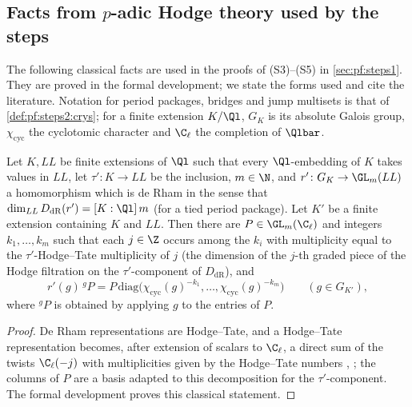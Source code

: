 \subsection{Facts from $p$-adic Hodge theory used by the steps}\label{sec:pf:geo:padic}

The following classical facts are used in the proofs of (S3)--(S5) in \cref{sec:pf:steps1}. They are
proved in the formal development; we state the forms used and cite the literature. Notation for
period packages, bridges and jump multisets is that of \cref{def:pf:steps2:crys}; for a finite
extension $K/\Ql$, $G_K$ is its absolute Galois group, $\chi_{\mathrm{cyc}}$ the cyclotomic character and
$\C_\ell$ the completion of $\Qlbar$.

\begin{proposition}\label{pf:geo:htbasis}
Let $K,LL$ be finite extensions of $\Ql$ such that every $\Ql$-embedding of $K$ takes values in $LL$, let
$\tau'\colon K\to LL$ be the inclusion, $m\in\N$, and $r'\colon G_K\to\GL_m(LL)$ a homomorphism which is de Rham
in the sense that $\dim_{LL}D_{\mathrm{dR}}(r')=[K:\Ql]\,m$ (for a tied period package). Let $K'$ be a finite
extension containing $K$ and $LL$. Then there are $P\in\GL_m(\C_\ell)$ and integers $k_1,\dots,k_m$ such that
each $j\in\Z$ occurs among the $k_i$ with multiplicity equal to the $\tau'$-Hodge--Tate multiplicity of $j$ (the
dimension of the $j$-th graded piece of the Hodge filtration on the $\tau'$-component of $D_{\mathrm{dR}}$),
and
\[
  r'(g)\,{}^gP=P\,\mathrm{diag}\bigl(\chi_{\mathrm{cyc}}(g)^{-k_1},\dots,\chi_{\mathrm{cyc}}(g)^{-k_m}\bigr)\qquad(g\in G_{K'}),
\]
where ${}^gP$ is obtained by applying $g$ to the entries of $P$.
\end{proposition}

\begin{proof}
De Rham representations are Hodge--Tate, and a Hodge--Tate representation becomes, after extension of
scalars to $\C_\ell$, a direct sum of the twists $\C_\ell(-j)$ with multiplicities given by the Hodge--Tate
numbers \cite{Fontaine1994}, \cite{Tate1967pdiv}; the columns of $P$ are a basis adapted to this
decomposition for the $\tau'$-component. The formal development proves this classical statement.
\end{proof}

